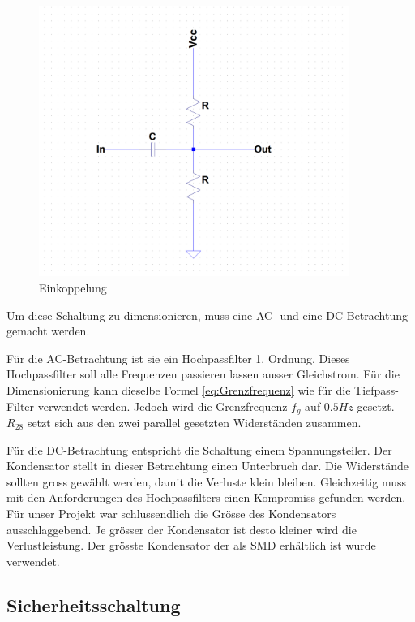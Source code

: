 \begin{figure}[H]
\begin{center}
\includegraphics[width=0.9\textwidth]{images/Analoge_Schaltung_Einkoppelung.png}
\caption{Einkoppelung}
\label{fig:Einkoppelung}
\end{center}
\end{figure}

Um diese Schaltung zu dimensionieren, muss eine AC- und eine DC-Betrachtung gemacht werden.


Für die AC-Betrachtung ist sie ein Hochpassfilter 1. Ordnung. Dieses Hochpassfilter soll alle Frequenzen passieren lassen ausser Gleichstrom. Für die Dimensionierung kann dieselbe Formel \eqref{eq:Grenzfrequenz} wie für die Tiefpass-Filter verwendet werden. Jedoch wird die Grenzfrequenz $f_g$ auf $0.5 Hz$ gesetzt. $R_{28}$ setzt sich aus den  zwei parallel gesetzten Widerständen zusammen.


Für die DC-Betrachtung entspricht die Schaltung einem Spannungsteiler. Der Kondensator stellt in dieser Betrachtung einen Unterbruch dar. Die Widerstände sollten gross gewählt werden, damit die Verluste klein bleiben. Gleichzeitig muss mit den Anforderungen des Hochpassfilters einen Kompromiss gefunden werden. Für unser Projekt war schlussendlich die Grösse des Kondensators ausschlaggebend. Je grösser der Kondensator ist desto kleiner wird die Verlustleistung. Der grösste Kondensator der als SMD\cite{wikiSMD} erhältlich ist wurde verwendet.

\subsection{Sicherheitsschaltung}


